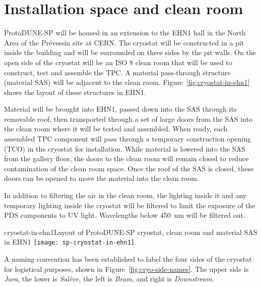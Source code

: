 
\section{Installation space and clean room}

ProtoDUNE-SP will be housed in an extension to the EHN1 hall in the North Area of the Pr\'{e}vessin site at CERN. 
The cryostat will be constructed in a pit inside the building and will be surrounded on three sides by the pit walls.  On the open side of the cryostat will be an ISO 8 clean room that will be used to construct, test and assemble the TPC. A material pass-through structure (material SAS) will be adjacent to the clean room. Figure~\ref{fig:cryostat-in-ehn1} shows the layout of these structures in EHN1. 

Material will be brought into EHN1, passed down into the SAS through its removable roof, then transported through a set of large doors from the SAS into the clean room where it will be tested and assembled. When ready, each assembled TPC component will pass through a temporary construction opening (TCO) in the cryostat for installation.
While material is lowered into the SAS from the gallery floor, the doors to the clean room will remain closed to reduce contamination of the clean room space.
Once the roof of the SAS is closed, these doors can be opened to move the material into the clean room.  

In addition to filtering the air in the clean room, the lighting inside it and any temporary lighting inside the cryostat will be filtered to limit the exposure of the PDS components to UV light.  Wavelengths below 450~nm will be filtered out.   

\begin{cdrfigure}{cryostat-in-ehn1}{Layout of ProtoDUNE-SP cryostat, clean room and material SAS in EHN1}
\texttt{[image: sp-cryostat-in-ehn1]}
\end{cdrfigure}

A naming convention has been established to label the four sides of the cryostat for logistical purposes, shown in Figure~\ref{fig:cryo-side-names}.  The upper side is \textit{Jura}, the lower is \textit{Sal\`{e}ve}, the left is \textit{Beam}, and right is \textit{Downstream}.

